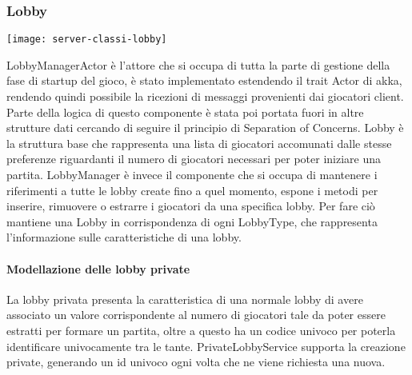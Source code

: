 \subsubsection{Lobby}
\begin{center}
    \texttt{[image: server-classi-lobby]}
\end{center}
LobbyManagerActor è l’attore che si occupa di tutta la parte di gestione della fase di startup del gioco, è stato implementato estendendo il trait Actor di akka, rendendo quindi possibile la ricezioni di messaggi provenienti dai giocatori client.
Parte della logica di questo componente è stata poi portata fuori in altre strutture dati cercando di seguire il principio di Separation of Concerns.
Lobby è la struttura base che rappresenta una lista di giocatori accomunati dalle stesse preferenze riguardanti il numero di giocatori necessari per poter iniziare una partita.
LobbyManager è invece il componente che si occupa di mantenere i riferimenti a tutte le lobby create fino a quel momento, espone i metodi per inserire, rimuovere o estrarre i giocatori da una specifica lobby.
Per fare ciò mantiene una Lobby in corrispondenza di ogni LobbyType, che rappresenta l’informazione sulle caratteristiche di una lobby.

\paragraph{Modellazione delle lobby private}
La lobby privata presenta la caratteristica di una normale lobby di avere associato un valore corrispondente al numero di giocatori tale da poter essere estratti per formare un partita, oltre a questo ha un codice univoco per poterla identificare univocamente tra le tante.
PrivateLobbyService supporta la creazione private, generando un id univoco ogni volta che ne viene richiesta una nuova.

